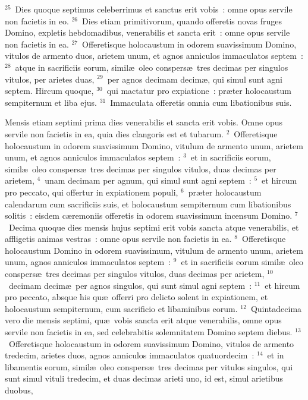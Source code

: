 ${}^{25}$~Dies quoque septimus celeberrimus et sanctus erit vobis~: omne opus servile non facietis in eo.
${}^{26}$~Dies etiam primitivorum, quando offeretis novas fruges Domino, expletis hebdomadibus, venerabilis et sancta erit~: omne opus servile non facietis in ea.
${}^{27}$~Offeretisque holocaustum in odorem suavissimum Domino, vitulos de armento duos, arietem unum, et agnos anniculos immaculatos septem~:
${}^{28}$~atque in sacrificiis eorum, simil\ae\ oleo conspers\ae\ tres decimas per singulos vitulos, per arietes duas,
${}^{29}$~per agnos decimam decim\ae , qui simul sunt agni septem. Hircum quoque,
${}^{30}$~qui mactatur pro expiatione~: pr\ae ter holocaustum sempiternum et liba ejus.
${}^{31}$~Immaculata offeretis omnia cum libationibus suis.

\lettrine[lines=3,image=true,loversize=0.05,lraise=-0.03]{M}{}ensis etiam septimi prima dies venerabilis et sancta erit vobis. Omne opus servile non facietis in ea, quia dies clangoris est et tubarum.
${}^{2}$~Offeretisque holocaustum in odorem suavissimum Domino, vitulum de armento unum, arietem unum, et agnos anniculos immaculatos septem~:
${}^{3}$~et in sacrificiis eorum, simil\ae\ oleo conspers\ae\ tres decimas per singulos vitulos, duas decimas per arietem,
${}^{4}$~unam decimam per agnum, qui simul sunt agni septem~:
${}^{5}$~et hircum pro peccato, qui offertur in expiationem populi,
${}^{6}$~pr\ae ter holocaustum calendarum cum sacrificiis suis, et holocaustum sempiternum cum libationibus solitis~: eisdem c\ae remoniis offeretis in odorem suavissimum incensum Domino.
${}^{7}$~Decima quoque dies mensis hujus septimi erit vobis sancta atque venerabilis, et affligetis animas vestras~: omne opus servile non facietis in ea.
${}^{8}$~Offeretisque holocaustum Domino in odorem suavissimum, vitulum de armento unum, arietem unum, agnos anniculos immaculatos septem~:
${}^{9}$~et in sacrificiis eorum simil\ae\ oleo conspers\ae\ tres decimas per singulos vitulos, duas decimas per arietem,
${}^{10}$~decimam decim\ae\ per agnos singulos, qui sunt simul agni septem~:
${}^{11}$~et hircum pro peccato, absque his qu\ae\ offerri pro delicto solent in expiationem, et holocaustum sempiternum, cum sacrificio et libaminibus eorum.
${}^{12}$~Quintadecima vero die mensis septimi, qu\ae\ vobis sancta erit atque venerabilis, omne opus servile non facietis in ea, sed celebrabitis solemnitatem Domino septem diebus.
${}^{13}$~Offeretisque holocaustum in odorem suavissimum Domino, vitulos de armento tredecim, arietes duos, agnos anniculos immaculatos quatuordecim~:
${}^{14}$~et in libamentis eorum, simil\ae\ oleo conspers\ae\ tres decimas per vitulos singulos, qui sunt simul vituli tredecim, et duas decimas arieti uno, id est, simul arietibus duobus,
